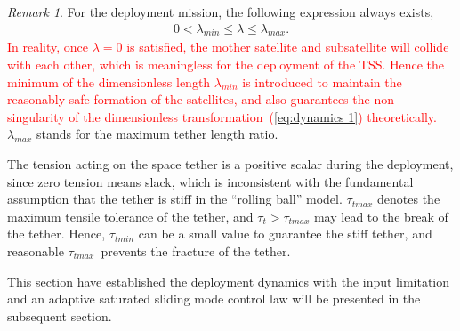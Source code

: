 \documentclass[3p]{elsarticle}
\theoremstyle{plain}
\theoremstyle{remark}
\newtheorem{myrem}{Remark}
\begin{document}
\begin{myrem}

For the deployment mission, the following expression always exists,
\begin{align}
0<\lambda_{min}\le\lambda\le \lambda_{max}\label{eq:lambda}.
\end{align}
\textcolor{red}{In reality, once $\lambda = 0$ is satisfied, the mother satellite and subsatellite will collide with each other, which is meaningless for the deployment of the TSS. Hence the minimum of the dimensionless length $\lambda_{min}$ is introduced to maintain the reasonably safe formation of the satellites, and also guarantees the non-singularity of the dimensionless transformation~(\ref{eq:dynamics 1}) theoretically.} $\lambda_{max}$ stands for the maximum tether length ratio.\par
The tension acting on the space tether is a positive scalar during the deployment, since zero tension means slack, which is inconsistent with the fundamental assumption that the tether is stiff in the ``rolling ball'' model. $\tau_{tmax}$ denotes the maximum tensile tolerance of the tether, and $\tau_t>\tau_{tmax}$ may lead to the break of the tether. Hence, $\tau_{tmin}$ can be a small value to guarantee the stiff tether, and reasonable $\tau_{tmax}$\ prevents the fracture of the tether.
\end{myrem}
This section have established the deployment dynamics with the input limitation and an adaptive saturated sliding mode control law will be presented in the subsequent section.
\end{document}
